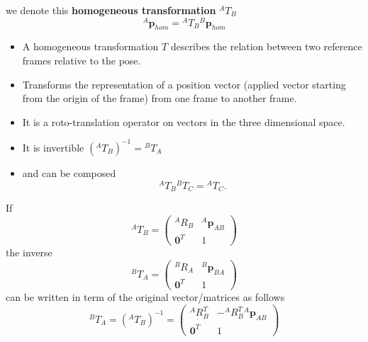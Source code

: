 \documentclass[10pt, letterpaper]{report}
\begin{document}
we denote this \textbf{homogeneous transformation} ${}^AT_B$\begin{equation}
     {}^A\mathbf p_{hom}={}^AT_B{}^B\mathbf p_{hom}
\end{equation}\begin{itemize}
    \item A homogeneous transformation $T$ describes the relation between two reference frames relative to the pose.
    \item Transforms the representation of a position vector
(applied vector starting from the origin of the frame)
from one frame to another frame.
\item It is a roto-translation operator on vectors in the three dimensional space. 
\item It is invertible $({}^AT_B)^{-1}={}^BT_A$
\item and can be composed\begin{equation}
    {}^AT_B{}^BT_C={}^AT_C.
\end{equation}
\end{itemize}
If $${}^AT_B=\begin{pmatrix}
    {}^AR_B&{}^A\mathbf p_{AB}\\ 
    \mathbf 0^T&1
\end{pmatrix}$$
the inverse 
$${}^BT_A=\begin{pmatrix}
    {}^BR_A&{}^B\mathbf p_{BA}\\ 
    \mathbf 0^T&1
\end{pmatrix}$$
can be written in term of the original vector/matrices as follows\begin{equation}
    {}^BT_A=({}^AT_B)^{-1}=\begin{pmatrix}
    {}^AR_B^T&-{}^AR_B^T{}^A\mathbf p_{AB}\\ 
    \mathbf 0^T&1
\end{pmatrix}
\end{equation}
\end{document}

